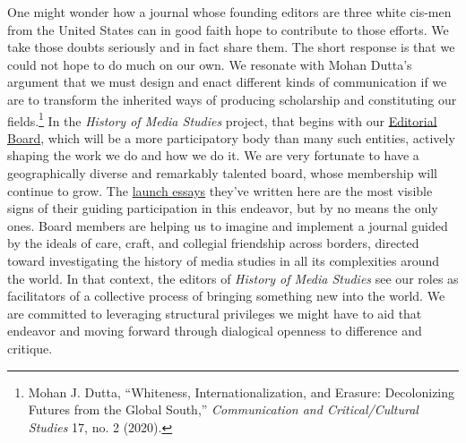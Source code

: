 \documentclass{tufte-handout}
\begin{document}
One might wonder how a journal whose founding editors are three white
cis-men from the United States can in good faith hope to contribute to
those efforts. We take those doubts seriously and in fact share them.
The short response is that we could not hope to do much on our own. We
resonate with Mohan Dutta's argument that we must design and enact
different kinds of communication if we are to transform the inherited
ways of producing scholarship and constituting our
fields.\footnote{Mohan J. Dutta, ``Whiteness, Internationalization, and Erasure:
  Decolonizing Futures from the Global South,'' \emph{Communication and
  Critical/Cultural Studies} 17, no. 2 (2020).
} In the \emph{History of
Media Studies} project, that begins with our
\href{https://hms.mediastudies.press/editorial}{Editorial Board}, which
will be a more participatory body than many such entities, actively
shaping the work we do and how we do it. We are very fortunate to have a
geographically diverse and remarkably talented board, whose membership
will continue to grow. The
\href{https://hms.mediastudies.press/launch-essays}{launch essays}
they've written here are the most visible signs of their guiding
participation in this endeavor, but by no means the only ones. Board
members are helping us to imagine and implement a journal guided by the
ideals of care, craft, and collegial friendship across borders, directed
toward investigating the history of media studies in all its
complexities around the world. In that context, the editors of
\emph{History of Media Studies} see our roles as facilitators of a
collective process of bringing something new into the world. We are
committed to leveraging structural privileges we might have to aid that
endeavor and moving forward through dialogical openness to difference
and critique.
\end{document}
